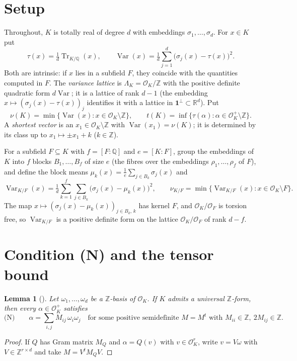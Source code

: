 \documentclass[11pt]{amsart}
\newtheorem{lemma}[theorem]{Lemma}
\theoremstyle{definition}
\DeclareMathOperator{\Tr}{Tr}
\DeclareMathOperator{\Var}{Var}
\newcommand{\OK}{\mathcal{O}_K}
\newcommand{\OF}{\mathcal{O}_F}
\newcommand{\Q}{\mathbb{Q}}
\newcommand{\Z}{\mathbb{Z}}
\newcommand{\R}{\mathbb{R}}
\newcommand{\LamK}{\Lambda_K}
\newcommand{\nurel}{\nu_{K/F}}
\begin{document}
\section{Setup}\label{sec:setup}

Throughout, $K$ is totally real of degree $d$ with embeddings $\sigma_1,\dots,\sigma_d$.
For $x\in K$ put
\[
\tau(x)=\tfrac1d\Tr_{K/\Q}(x),\qquad
\Var(x)=\tfrac1d\sum_{j=1}^d\bigl(\sigma_j(x)-\tau(x)\bigr)^2 .
\]
Both are intrinsic: if $x$ lies in a subfield $F$, they coincide with the quantities computed
in $F$.  The \emph{variance lattice} is $\LamK=\OK/\Z$ with the positive definite quadratic
form $d\Var$; it is a lattice of rank $d-1$ (the embedding $x\mapsto(\sigma_j(x)-\tau(x))_j$
identifies it with a lattice in $\mathbf 1^\perp\subset\R^d$).  Put
\[
\nu(K)=\min\{\Var(x):x\in\OK\setminus\Z\},\qquad
t(K)=\inf\{\tau(\alpha):\alpha\in\OK^+\setminus\Z\}.
\]
A \emph{shortest vector} is an $x_1\in\OK\setminus\Z$ with $\Var(x_1)=\nu(K)$; it is determined
by its class up to $x_1\mapsto\pm x_1+k$ ($k\in\Z$).

For a subfield $F\subseteq K$ with $f=[F:\Q]$ and $e=[K:F]$, group the embeddings of $K$ into
$f$ blocks $B_1,\dots,B_f$ of size $e$ (the fibres over the embeddings $\rho_1,\dots,\rho_f$
of $F$), and define the block means $\mu_k(x)=\frac1e\sum_{j\in B_k}\sigma_j(x)$ and
\[
\Var_{K/F}(x)=\tfrac1d\sum_{k=1}^f\sum_{j\in B_k}\bigl(\sigma_j(x)-\mu_k(x)\bigr)^2,
\qquad \nurel=\min\{\Var_{K/F}(x):x\in\OK\setminus F\}.
\]
The map $x\mapsto(\sigma_j(x)-\mu_k(x))_{j\in B_k,\,k}$ has kernel $F$, and $\OK/\OF$ is
torsion free, so $\Var_{K/F}$ is a positive definite form on the lattice $\OK/\OF$ of rank
$d-f$.

\section{Condition (N) and the tensor bound}\label{sec:tensor}

\begin{lemma}[{\cite[Prop.~3.1]{KY1}}]\label{lem:N}
Let $\omega_1,\dots,\omega_d$ be a $\Z$-basis of $\OK$.  If $K$ admits a universal $\Z$-form,
then every $\alpha\in\OK^+$ satisfies
\[
\text{(N)}\qquad \alpha=\sum_{i,j}M_{ij}\,\omega_i\omega_j\quad\text{for some positive
semidefinite } M=M^t\text{ with } M_{ii}\in\Z,\ 2M_{ij}\in\Z .
\]
\end{lemma}

\begin{proof}
If $Q$ has Gram matrix $M_Q$ and $\alpha=Q(v)$ with $v\in\OK^r$, write $v=V\omega$ with
$V\in\Z^{r\times d}$ and take $M=V^tM_QV$.
\end{proof}
\end{document}
